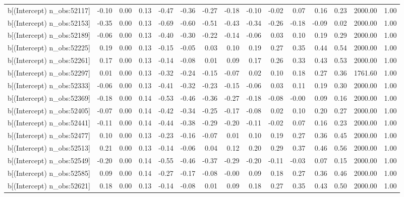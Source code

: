 \begin{table}[ht]
\begin{tabular}{rrrrrrrrrrrrrrr}
  b[(Intercept) n\_obs:52117] & -0.10 & 0.00 & 0.13 & -0.47 & -0.36 & -0.27 & -0.18 & -0.10 & -0.02 & 0.07 & 0.16 & 0.23 & 2000.00 & 1.00 \\ 
  b[(Intercept) n\_obs:52153] & -0.35 & 0.00 & 0.13 & -0.69 & -0.60 & -0.51 & -0.43 & -0.34 & -0.26 & -0.18 & -0.09 & 0.02 & 2000.00 & 1.00 \\ 
  b[(Intercept) n\_obs:52189] & -0.06 & 0.00 & 0.13 & -0.40 & -0.30 & -0.22 & -0.14 & -0.06 & 0.03 & 0.10 & 0.19 & 0.29 & 2000.00 & 1.00 \\ 
  b[(Intercept) n\_obs:52225] & 0.19 & 0.00 & 0.13 & -0.15 & -0.05 & 0.03 & 0.10 & 0.19 & 0.27 & 0.35 & 0.44 & 0.54 & 2000.00 & 1.00 \\ 
  b[(Intercept) n\_obs:52261] & 0.17 & 0.00 & 0.13 & -0.14 & -0.08 & 0.01 & 0.09 & 0.17 & 0.26 & 0.33 & 0.43 & 0.53 & 2000.00 & 1.00 \\ 
  b[(Intercept) n\_obs:52297] & 0.01 & 0.00 & 0.13 & -0.32 & -0.24 & -0.15 & -0.07 & 0.02 & 0.10 & 0.18 & 0.27 & 0.36 & 1761.60 & 1.00 \\ 
  b[(Intercept) n\_obs:52333] & -0.06 & 0.00 & 0.13 & -0.41 & -0.32 & -0.23 & -0.15 & -0.06 & 0.03 & 0.11 & 0.19 & 0.30 & 2000.00 & 1.00 \\ 
  b[(Intercept) n\_obs:52369] & -0.18 & 0.00 & 0.14 & -0.53 & -0.46 & -0.36 & -0.27 & -0.18 & -0.08 & -0.00 & 0.09 & 0.16 & 2000.00 & 1.00 \\ 
  b[(Intercept) n\_obs:52405] & -0.07 & 0.00 & 0.14 & -0.42 & -0.34 & -0.25 & -0.17 & -0.08 & 0.02 & 0.10 & 0.20 & 0.27 & 2000.00 & 1.00 \\ 
  b[(Intercept) n\_obs:52441] & -0.11 & 0.00 & 0.14 & -0.44 & -0.38 & -0.29 & -0.20 & -0.11 & -0.02 & 0.07 & 0.16 & 0.23 & 2000.00 & 1.00 \\ 
  b[(Intercept) n\_obs:52477] & 0.10 & 0.00 & 0.13 & -0.23 & -0.16 & -0.07 & 0.01 & 0.10 & 0.19 & 0.27 & 0.36 & 0.45 & 2000.00 & 1.00 \\ 
  b[(Intercept) n\_obs:52513] & 0.21 & 0.00 & 0.13 & -0.14 & -0.06 & 0.04 & 0.12 & 0.20 & 0.29 & 0.37 & 0.46 & 0.56 & 2000.00 & 1.00 \\ 
  b[(Intercept) n\_obs:52549] & -0.20 & 0.00 & 0.14 & -0.55 & -0.46 & -0.37 & -0.29 & -0.20 & -0.11 & -0.03 & 0.07 & 0.15 & 2000.00 & 1.00 \\ 
  b[(Intercept) n\_obs:52585] & 0.09 & 0.00 & 0.14 & -0.27 & -0.17 & -0.08 & -0.00 & 0.09 & 0.18 & 0.27 & 0.36 & 0.46 & 2000.00 & 1.00 \\ 
  b[(Intercept) n\_obs:52621] & 0.18 & 0.00 & 0.13 & -0.14 & -0.08 & 0.01 & 0.09 & 0.18 & 0.27 & 0.35 & 0.43 & 0.50 & 2000.00 & 1.00 \\ 

\end{tabular}
\end{table}
